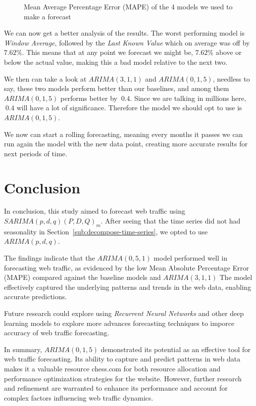 \documentclass[journal]{IEEEtran}
\begin{document}
\begin{figure}[htbp]
  \centering
  
    \caption{Mean Average Percentage Error (MAPE) of the 4 models we used to
    make  a forecast}
    \label{fig:mape}
\end{figure}

We can now get a better analysis of the results. The worst performing model is
\emph{Window Average}, followed by the \emph{Last Known Value} which on
average was off by $7.62\%$. This means that at any point we forecast we might
be, $7.62\%$ above or below the actual value, making this a bad model relative
to the next two.

We then can take a look at $ARIMA(3,1,1)$ and $ARIMA(0,1,5)$, needless to say,
these two models perform better than our baselines, and among them
$ARIMA(0,1,5)$ performs better by $~0.4$. Since we are talking in millions
here, $~0.4$ will have a lot of significance. Therefore the model we should
opt to use is $ARIMA(0,1,5)$.

We now can start a rolling forecasting, meaning every months it passes we can
run again the model with the new data point,  creating more accurate results
for next periods of time.

\section{Conclusion}\label{sec:conclusion}

In conclusion, this study aimed to forecast web traffic using
$SARIMA(p,d,q)(P,D,Q)_m$. After seeing that the time series did not had
seasonality in Section~\ref{sub:decompose-time-series}, we opted to use
$ARIMA(p,d,q)$.

The findings indicate that the $ARIMA(0,5,1)$ model performed well in
forecasting web traffic, as evidenced by the low Mean Absolute Percentage
Error (MAPE) compared against the baseline models and $ARIMA(3,1,1)$  The
model effectively captured the underlying patterns and trends in the web data,
enabling accurate predictions.

Future research could explore using \emph{Recurrent Neural Networks} and other
deep learning models to explore more advances forecasting techniques to
imporce accuracy of web traffic forecasting.

In summary, $ARIMA(0,1,5)$ demonstrated its potential as an effective tool for
web traffic forecasting. Its ability to capture and predict patterns in web
data makes it a valuable resource chess.com for both resource allocation and
performance optimization strategies for the website. However, further research
and refinement are warranted to enhance its performance and account for
complex factors influencing web traffic dynamics.
\end{document}
